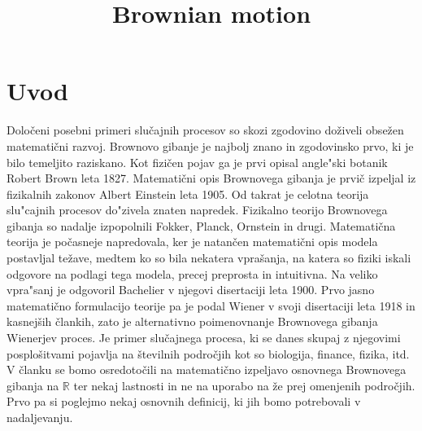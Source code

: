 \documentclass[twoside,11pt]{article}
\begin{document}



\klasifikacija{~} 
\title{Brownian motion}

\glava\baselineskip=14.5pt

\smallskip

\section{Uvod}

Določeni posebni primeri slučajnih procesov so skozi zgodovino doživeli obsežen
matematični razvoj. Brownovo gibanje je najbolj znano in zgodovinsko prvo, ki je bilo 
temeljito raziskano. Kot fizičen pojav ga je prvi opisal angle"ski botanik Robert Brown leta 1827.
Matematični opis Brownovega gibanja je prvič izpeljal iz fizikalnih zakonov Albert
Einstein leta 1905. Od takrat je celotna teorija slu"cajnih procesov do"zivela znaten napredek. Fizikalno teorijo Brownovega gibanja
so nadalje izpopolnili Fokker, Planck, Ornstein in drugi. Matematična 
teorija je počasneje napredovala, ker je natančen matematični opis modela postavljal 
težave, medtem ko so bila nekatera vprašanja, na katera so fiziki iskali odgovore na
podlagi tega modela, precej preprosta in intuitivna. Na veliko vpra"sanj je odgovoril Bachelier
v njegovi disertaciji leta 1900.
Prvo jasno matematično formulacijo teorije pa je podal Wiener v svoji
disertaciji leta 1918 in kasnejših člankih, zato je alternativno poimenovnanje 
Brownovega gibanja Wienerjev proces. Je primer slučajnega procesa, ki se danes skupaj z 
njegovimi posplošitvami pojavlja na številnih področjih kot so biologija, finance, fizika,
itd. V članku se bomo osredotočili na matematično izpeljavo osnovnega Brownovega gibanja 
na $\mathbb{R}$ ter nekaj lastnosti in ne na uporabo na že prej omenjenih področjih.
Prvo pa si poglejmo nekaj osnovnih definicij, ki jih bomo potrebovali v nadaljevanju.
\end{document}
